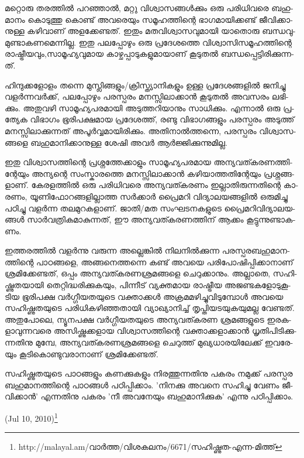 ­മ­റ്റൊ­രു തര­ത്തില്‍ പറ­ഞ്ഞാല്‍, മറ്റു വി­ശ്വാ­സ­ങ്ങള്‍­ക്കും ഒരു പരി­ധി­വ­രെ ബഹു­മാ­നം കൊ­ടു­ത്തു കൊ­ണ്ട് അവ­രെ­യും സമൂ­ഹ­ത്തി­ന്റെ 
ഭാ­ഗ­മാ­യി­ക്ക­ണ്ട് ജീ­വി­ക്കാ­നു­ള്ള കഴി­വാ­ണ് അള­ക്കേ­ണ്ട­ത്. ഇതും മത­വി­ശ്വാ­സ­വു­മാ­യി യാ­തൊ­രു ബന്ധ­വു­മു­ണ്ടാ­ക­ണ­മെ­ന്നി­ല്ല. ഇതു 
പല­പ്പോ­ഴും ഒരു പ്ര­ദേ­ശ­ത്തെ വി­ശ്വാ­സി­സ­മൂ­ഹ­ത്തി­ന്റെ രാ­ഷ്ട്രീ­യ­വും­,­സാ­മൂ­ഹ്യ­വു­മായ കാ­ഴ്ച­പ്പാ­ടു­ക­ളു­മാ­യാ­ണ് കൂ­ടു­തല്‍ ബന്ധ­പ്പെ­ട്ടി­രി­ക്കു­ന്ന­ത്.

­ഹി­ന്ദു­ക്ക­ളോ­ളം തന്നെ മു­സ്ലി­ങ്ങ­ളും­/­ക്രി­സ്ത്യാ­നി­ക­ളും ഉള്ള പ്ര­ദേ­ശ­ങ്ങ­ളില്‍ ജനി­ച്ചു വളര്‍­ന്ന­വര്‍­ക്ക്, പല­പ്പോ­ഴും പര­സ്പ­രം മന­സ്സി­ലാ­ക്കാന്‍ 
കൂ­ടു­തല്‍ അവ­സ­രം ലഭി­ക്കും. അതു­വ­ഴി സാ­മൂ­ഹ്യ­പ­ര­മാ­യി അടു­ത്ത­റി­യാ­നും സാ­ധി­ക്കും. എന്നാല്‍ ഒരു പ്ര­ത്യേക വി­ഭാ­ഗം ഭൂ­രി­പ­ക്ഷ­മായ
 പ്ര­ദേ­ശ­ത്ത്, രണ്ടു വി­ഭാ­ഗ­ങ്ങ­ളും പര­സ്പ­രം അടു­ത്ത് മന­സ്സി­ലാ­ക്കു­ന്ന­ത് അപൂര്‍­വ്വ­മാ­യി­രി­ക്കും. അതി­നാല്‍­ത്ത­ന്നെ, പര­സ്പ­രം വി­ശ്വാ­സ­ങ്ങ­ളെ
  ബഹു­മാ­നി­ക്കാ­നു­ള്ള ശേ­ഷി അവര്‍ ആര്‍­ജ്ജി­ക്കു­ന്നു­മി­ല്ല.

ഇ­തു വി­ശ്വാ­സ­ത്തി­ന്റെ പ്ര­ശ്ന­ത്തേ­ക്കാ­ളും സാ­മൂ­ഹ്യ­പ­ര­മായ അന്യ­വ­ത്ക­ര­ണ­ത്തി­ന്റേ­യും അന്യ­ന്റെ സം­സ്കാ­ര­ത്തെ മന­സ്സി­ലാ­ക്കാന്‍ 
കഴി­യാ­ത്ത­തി­ന്റേ­യും പ്ര­ശ്ന­ങ്ങ­ളാ­ണ്. കേ­ര­ള­ത്തില്‍ ഒരു പരി­ധി­വ­രെ അ­ന്യ­വ­ത്ക­ര­ണം­ ഇല്ലാ­തി­രു­ന്ന­തി­ന്റെ കാ­ര­ണം, 
യൂ­ണി­ഫോ­റ­ങ്ങ­ളി­ല്ലാ­ത്ത സര്‍­ക്കാര്‍ പ്രൈ­മ­റി വി­ദ്യാ­ല­യ­ങ്ങ­ളില്‍ ഒരു­മി­ച്ചു പഠി­ച്ചു വളര്‍­ന്ന തല­മു­റ­ക­ളാ­ണ്. ജാ­തി­/­മത സം­ഘ­ട­ന­ക­ളു­ടെ 
പ്രൈ­മ­റി­വി­ദ്യാ­ല­യ­ങ്ങള്‍ സാര്‍­വ­ത്രി­ക­മാ­കു­ന്ന­ത്, ഈ അന്യ­വ­ത്ക­ര­ണ­ത്തി­ന് ആക്കം കൂ­ട്ടു­ന്നു­ണ്ടാ­ക­ണം­.

ഇ­ത്ത­ര­ത്തില്‍ വളര്‍­ന്നു വരു­ന്ന അല്ലെ­ങ്കില്‍ നി­ല­നില്‍­ക്കു­ന്ന പര­സ്പ­ര­ബ­ഹു­മാ­ന­ത്തി­ന്റെ പാ­ഠ­ങ്ങ­ളെ, അങ്ങ­നെ­ത്ത­ന്നെ കണ്ട് അവ­യെ
 പരി­പോ­ഷി­പ്പി­ക്കാ­നാ­ണ് ശ്ര­മി­ക്കേ­ണ്ട­ത്, ഒപ്പം അന്യ­വ­ത്ക­ര­ണ­ശ്ര­മ­ങ്ങ­ളെ ചെ­റു­ക്കാ­നും. അല്ലാ­തെ, സഹി­ഷ്ണു­ത­യാ­യി തെ­റ്റി­ദ്ധ­രി­ക്കു­ക­യും, 
 പി­ന്നീ­ട് വ്യ­ക്ത­മായ രാ­ഷ്ട്രീയ അജ­ണ്ട­ക­ളോ­ടു­കൂ­ടിയ ഭൂ­രി­പ­ക്ഷ വര്‍­ഗ്ഗീ­യ­ത­യു­ടെ വക്താ­ക്കള്‍ അക്ര­മ­മ­ഴി­ച്ചു­വി­ടു­മ്പോള്‍ അവ­യെ സഹി­ഷ്ണു­ത­യു­ടെ 
 പരി­ധി­ക­ഴി­ഞ്ഞ­താ­യി വ്യാ­ഖ്യാ­നി­ച്ച് തൃ­പ്തി­യ­ട­യു­ക­യു­മ­ല്ല വേ­ണ്ട­ത്. അതു­പോ­ലെ, ന്യൂ­ന­പ­ക്ഷ വര്‍­ഗ്ഗീ­യ­ത­യു­ടെ അന്യ­വ­ത്ക­രണ ശ്ര­മ­ങ്ങ­ളു­ടെ 
 ഇര­ക­ളാ­വു­ന്ന­വ­രെ അസി­ഷ്ണു­ക്ക­ളായ വി­ശ്വാ­സ­ത്തി­ന്റെ വക്താ­ക്ക­ളാ­ക്കാന്‍ ധൃ­തി­പി­ടി­ക്കു­ന്ന­തി­നു മു­മ്പേ, അന്യ­വ­ത്ക­ര­ണ­ശ്ര­മ­ങ്ങ­ളെ 
 ചെ­റു­ത്ത് മു­ഖ്യ­ധാ­ര­യി­ലേ­ക്ക് ഇവ­രേ­യും കൂ­ടി­കൊ­ണ്ടു­വ­രാ­നാ­ണ് ശ്ര­മി­ക്കേ­ണ്ട­ത്.

­സ­ഹി­ഷ്ണു­ത­യു­ടെ പാ­ഠ­ങ്ങ­ളും കണ­ക്കു­ക­ളും നി­ര­ത്തു­ന്ന­തി­നു പക­രം നമു­ക്ക് പര­സ്പര ബഹു­മാ­ന­ത്തി­ന്റെ പാ­ഠ­ങ്ങള്‍ പഠി­പ്പി­ക്കാം. 
'നി­ന­ക്കു അവ­നെ സഹി­ച്ചു വേ­ണം ജീ­വി­ക്കാന്‍' എന്ന­തി­നു പക­രം 'നീ അവ­നേ­യും ബഹു­മാ­നി­ക്കു­ക' എന്നു പഠി­പ്പി­ക്കാം­.

(Jul 10, 2010)\footnote{http://malayal.am/വാര്‍ത്ത/വിശകലനം/6671/സഹിഷ്ണുത-എന്ന-മിത്ത്}
\newpage

